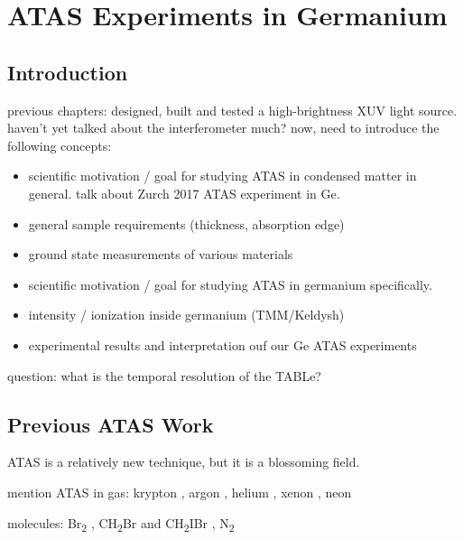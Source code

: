 \chapter{ATAS Experiments in Germanium}
\label{chap:ATAS_in_Ge}


\section{Introduction}

previous chapters: designed, built and tested a high-brightness XUV light source. haven't yet talked about the interferometer much? now, need to introduce the following concepts:
\begin{itemize}
	\item scientific motivation / goal for studying ATAS in condensed matter in general. talk about Zurch 2017 ATAS experiment in Ge.
	\item general sample requirements (thickness, absorption edge)
	\item ground state measurements of various materials
	\item scientific motivation / goal for studying ATAS in germanium specifically.
	\item intensity / ionization inside germanium (TMM/Keldysh)
	\item experimental results and interpretation ouf our Ge ATAS experiments
\end{itemize}

question: what is the temporal resolution of the TABLe? 


\section{Previous ATAS Work}

ATAS is a relatively new technique, but it is a blossoming field.

mention ATAS in gas: krypton \cite{goulielmakisRealtimeObservationValence2010}, argon \cite{wangAttosecondTimeResolvedAutoionization2010,caoAttosecondTransientAbsorption2016,chewAttosecondTransientAbsorption2018}, helium \cite{chenLightinducedStatesAttosecond2012,bellIntensityDependenceLightinduced2013}, xenon \cite{linStrongfieldInducedXUV2012,bernhardtHighspectralresolutionAttosecondAbsorption2014,liInvestigationCouplingMechanisms2015}, neon \cite{beckAttosecondTransientAbsorption2014}

molecules: Br\textsubscript{2} \cite{hoslerCharacterizationVibrationalWave2013}, CH\textsubscript{2}Br and CH\textsubscript{2}IBr \cite{attarCoretovalenceSpectroscopicDetection2014}, N\textsubscript{2} \cite{warrickProbingDynamicsRydberg2016}

